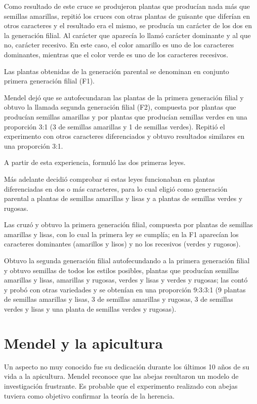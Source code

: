 \documentclass[letterpaper,11pt]{report}
\begin{document}
Como resultado de este cruce se produjeron plantas que producían nada más que semillas amarillas, repitió los cruces con otras plantas de guisante que diferían en otros caracteres y el resultado era el mismo, se producía un carácter de los dos en la generación filial. Al carácter que aparecía lo llamó carácter dominante y al que no, carácter recesivo. En este caso, el color amarillo es uno de los caracteres dominantes, mientras que el color verde es uno de los caracteres recesivos.

Las plantas obtenidas de la generación parental se denominan en conjunto primera generación filial (F1).

Mendel dejó que se autofecundaran las plantas de la primera generación filial y obtuvo la llamada segunda generación filial (F2), compuesta por plantas que producían semillas amarillas y por plantas que producían semillas verdes en una proporción 3:1 (3 de semillas amarillas y 1 de semillas verdes). Repitió el experimento con otros caracteres diferenciados y obtuvo resultados similares en una proporción 3:1.

A partir de esta experiencia, formuló las dos primeras leyes.

Más adelante decidió comprobar si estas leyes funcionaban en plantas diferenciadas en dos o más caracteres, para lo cual eligió como generación parental a plantas de semillas amarillas y lisas y a plantas de semillas verdes y rugosas.

Las cruzó y obtuvo la primera generación filial, compuesta por plantas de semillas amarillas y lisas, con lo cual la primera ley se cumplía; en la F1 aparecían los caracteres dominantes (amarillos y lisos) y no los recesivos (verdes y rugosos).

Obtuvo la segunda generación filial autofecundando a la primera generación filial y obtuvo semillas de todos los estilos posibles, plantas que producían semillas amarillas y lisas, amarillas y rugosas, verdes y lisas y verdes y rugosas; las contó y probó con otras variedades y se obtenían en una proporción 9:3:3:1 (9 plantas de semillas amarillas y lisas, 3 de semillas amarillas y rugosas, 3 de semillas verdes y lisas y una planta de semillas verdes y rugosas).

\newpage


\chapter{Mendel y la apicultura}


Un aspecto no muy conocido fue su dedicación durante los últimos 10 años de su vida a la apicultura. Mendel reconoce que las abejas resultaron un modelo de investigación frustrante. Es probable que el experimento realizado con abejas tuviera como objetivo confirmar la teoría de la herencia.
\end{document}
